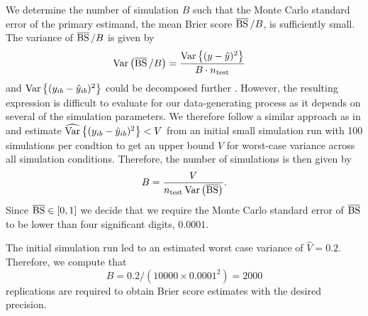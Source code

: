 We determine the number of simulation $B$ such that the Monte Carlo
standard error of the primary estimand, the mean Brier score $\operatorname{\overline{BS}}/B$,
is sufficiently small. The variance of $\operatorname{\overline{BS}}/B$ is given by
\begin{align*}
  \operatorname{Var}\left(\operatorname{\overline{BS}}/B\right)
  &= \frac{\operatorname{Var}\left\{(y -
    \hat{y})^{2}\right\}}{B \cdot n_{\text{test}}}
\end{align*}
and $\operatorname{Var}\left\{(y_{ib} - \hat{y}_{ib})^{2}\right\}$ could be decomposed further
\citep{Bradley2008}. However, the resulting expression is difficult to evaluate
for our data-generating process as it depends on several of the simulation
parameters. We therefore follow a similar approach as in \citet{Morris2019} and
estimate $\widehat{\operatorname{Var}}\left\{(y_{ib} - \hat{y}_{ib})^{2}\right\} < V$ from an
initial small simulation run with 100 simulations per condtion to get an upper
bound $V$ for worst-case variance across all simulation conditions.
Therefore, the number of simulations is then given by
$$B = \frac{V}{n_{\text{test}} \operatorname{Var}\left(\operatorname{\overline{BS}}\right)}.$$
Since $\operatorname{\overline{BS}} \in [0, 1]$ we decide that we require the Monte Carlo standard error
of $\operatorname{\overline{BS}}$ to be lower than four significant digits, $0.0001$.

The initial simulation run led to an estimated worst case variance of
$\widehat{V} = 0.2$. Therefore, we compute that
$$B = 0.2/(10000 \times 0.0001^{2}) = 2000$$
replications are required to obtain Brier score estimates with the
desired precision.

